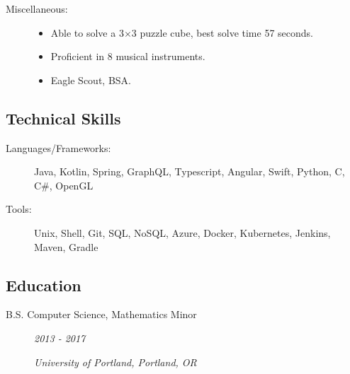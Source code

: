 \documentclass{article}
\def \intraspace {0.1em}
\begin{document}
\begin{description}
            \vspace{\intraspace}

        \item[Miscellaneous:] \hfill
            \begin{itemize}
                \item Able to solve a 3$\times$3 puzzle cube, best solve time 57 seconds.
                \item Proficient in 8 musical instruments.
                \item Eagle Scout, BSA.
        \end{itemize}
    \end{description}


\subsection*{Technical Skills}
    \begin{description}    
        \item[Languages/Frameworks:] 
            Java, 
            Kotlin,
            Spring,
            GraphQL,
            Typescript,
            Angular,
            Swift,
            Python,
            C,
            C\#,
            OpenGL

            \vspace{\intraspace}

        \item[Tools:] 
            Unix,
            Shell,
            Git,
            SQL,
            NoSQL,
            Azure,
            Docker,
            Kubernetes,
            Jenkins,
            Maven,
            Gradle
    \end{description}
    
\subsection*{Education}
    \begin{description}
        \item[B.S. Computer Science, Mathematics Minor]\hfill \textit{2013 - 2017}

        \textit{University of Portland, Portland, OR}
    \end{description}
\end{document}
